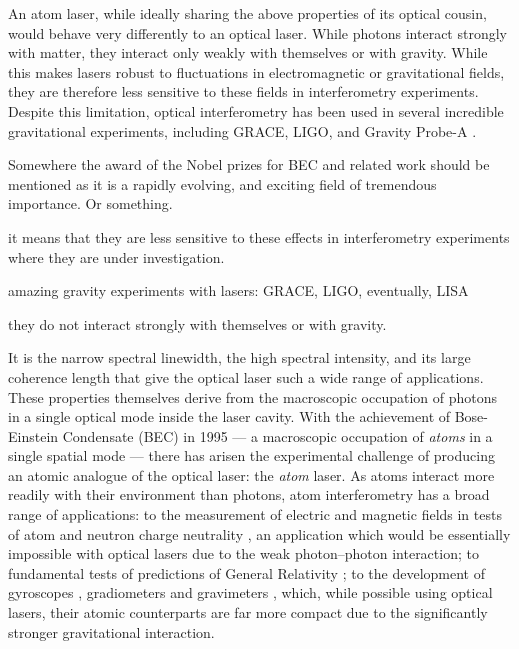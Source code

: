 An atom laser, while ideally sharing the above properties of its optical cousin, would behave very differently to an optical laser.  While photons interact strongly with matter, they interact only weakly with themselves or with gravity.  While this makes lasers robust to fluctuations in electromagnetic or gravitational fields, they are therefore less sensitive to these fields in interferometry experiments.  Despite this limitation, optical interferometry has been used in several incredible gravitational experiments, including GRACE, LIGO, and Gravity Probe-A \citep{Vessot:1980}.

Somewhere the award of the Nobel prizes for BEC and related work should be mentioned as it is a rapidly evolving, and exciting field of tremendous importance.  Or something.


it means that they are less sensitive to these effects in interferometry experiments where they are under investigation.  


amazing gravity experiments with lasers: GRACE, LIGO, eventually, LISA

they do not interact strongly with themselves or with gravity.  

It is the narrow spectral linewidth, the high spectral intensity, and its large coherence length that give the optical laser such a wide range of applications.  These properties themselves derive from the macroscopic occupation of photons in a single optical mode inside the laser cavity.  With the achievement of Bose-Einstein Condensate (BEC) in 1995 \citep{Anderson:1995vn,Bradley:1995ys,Davis:1995} --- a macroscopic occupation of \emph{atoms} in a single spatial mode --- there has arisen the experimental challenge of producing an atomic analogue of the optical laser: the \emph{atom} laser.  As atoms interact more readily with their environment than photons, atom interferometry has a broad range of applications: to the measurement of electric and magnetic fields in tests of atom and neutron charge neutrality \citep{Arvanitaki:2008}, an application which would be essentially impossible with optical lasers due to the weak photon--photon interaction; to fundamental tests of predictions of General Relativity \citep{Dimopoulos:2007uq}; to the development of gyroscopes \citep{Gustavson:1997}, gradiometers \citep{Snadden:1998,McGuirk:2002} and gravimeters \citep{Peters:2001}, which, while possible using optical lasers, their atomic counterparts are far more compact due to the significantly stronger gravitational interaction.

